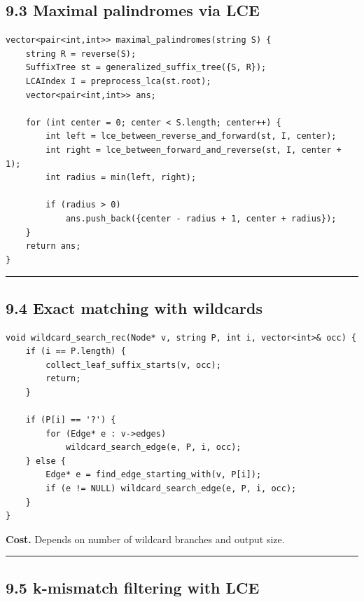 \documentclass[11pt]{article}
\begin{document}
\subsection{9.3 Maximal palindromes via LCE}\label{maximal-palindromes-via-lce}

\begin{verbatim}
vector<pair<int,int>> maximal_palindromes(string S) {
    string R = reverse(S);
    SuffixTree st = generalized_suffix_tree({S, R});
    LCAIndex I = preprocess_lca(st.root);
    vector<pair<int,int>> ans;

    for (int center = 0; center < S.length; center++) {
        int left = lce_between_reverse_and_forward(st, I, center);
        int right = lce_between_forward_and_reverse(st, I, center + 1);
        int radius = min(left, right);

        if (radius > 0)
            ans.push_back({center - radius + 1, center + radius});
    }
    return ans;
}
\end{verbatim}

\begin{center}\rule{0.5\linewidth}{0.5pt}\end{center}

\subsection{9.4 Exact matching with wildcards}\label{exact-matching-with-wildcards}

\begin{verbatim}
void wildcard_search_rec(Node* v, string P, int i, vector<int>& occ) {
    if (i == P.length) {
        collect_leaf_suffix_starts(v, occ);
        return;
    }

    if (P[i] == '?') {
        for (Edge* e : v->edges)
            wildcard_search_edge(e, P, i, occ);
    } else {
        Edge* e = find_edge_starting_with(v, P[i]);
        if (e != NULL) wildcard_search_edge(e, P, i, occ);
    }
}
\end{verbatim}

\textbf{Cost.} Depends on number of wildcard branches and output size.

\begin{center}\rule{0.5\linewidth}{0.5pt}\end{center}

\subsection{9.5 k-mismatch filtering with LCE}\label{k-mismatch-filtering-with-lce}
\end{document}
